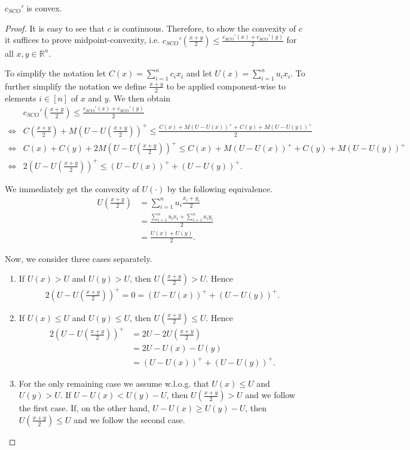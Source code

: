 \begin{lemma}
\label{lemma:integer_minimization_convexity}
$c_{SCO}'$ is convex.
\end{lemma}
\begin{proof}
It is easy to see that $c$ is continuous. Therefore, to show the convexity of $c$ it suffices to prove midpoint-convexity, i.e. $c_{SCO}'(\frac{x+y}{2}) \leq \frac{c_{SCO}'(x)+c_{SCO}'(y)}{2}$ for all $x, y \in \mathbb{R}^n$.

To simplify the notation let $C(x) = \sum_{i=1}^n c_i x_i$ and let $U(x) = \sum_{i=1}^n u_i x_i$. To further simplify the notation we define $\frac{x+y}{2}$ to be applied component-wise to elements $i \in [n]$ of $x$ and $y$. We then obtain \small{
\begin{align*}
         &c_{SCO}'(\frac{x+y}{2}) \leq \frac{c_{SCO}'(x)+c_{SCO}'(y)}{2} \\
    \iff &C(\frac{x+y}{2}) + M(U - U(\frac{x+y}{2}))^+ \leq \frac{C(x) + M(U - U(x))^+ + C(y) + M(U - U(y))^+}{2} \\
    \iff &C(x) + C(y) + 2M(U - U(\frac{x+y}{2}))^+ \leq C(x) + M(U - U(x))^+ + C(y) + M(U - U(y))^+ \\
    \iff &2(U - U(\frac{x+y}{2}))^+ \leq (U - U(x))^+ + (U - U(y))^+.
\end{align*}
}\normalsize

We immediately get the convexity of $U(\cdot)$ by the following equivalence. \begin{align*}
    U(\frac{x+y}{2}) &= \sum_{i=1}^n u_i \frac{x_i + y_i}{2} \\
                     &= \frac{\sum_{i=1}^n u_i x_i + \sum_{i=1}^n u_i y_i}{2} \\
                     &= \frac{U(x) + U(y)}{2}.
\end{align*}

Now, we consider three cases separately.

\begin{enumerate}
    \item If $U(x) > U$ and $U(y) > U$, then $U(\frac{x+y}{2}) > U$. Hence \begin{align*}
        2(U - U(\frac{x+y}{2}))^+ = 0 = (U - U(x))^+ + (U - U(y))^+.
    \end{align*}
    \item If $U(x) \leq U$ and $U(y) \leq U$, then $U(\frac{x+y}{2}) \leq U$. Hence \begin{align*}
        2(U - U(\frac{x+y}{2}))^+ &= 2U - 2U(\frac{x+y}{2}) \\
                                  &= 2U - U(x) - U(y) \\
                                  &= (U - U(x))^+ + (U - U(y))^+.
    \end{align*}
    \item For the only remaining case we assume w.l.o.g. that $U(x) \leq U$ and $U(y) > U$. If $U - U(x) < U(y) - U$, then $U(\frac{x+y}{2}) > U$ and we follow the first case. If, on the other hand, $U - U(x) \geq U(y) - U$, then $U(\frac{x+y}{2}) \leq U$ and we follow the second case.\qedhere
\end{enumerate}
\end{proof}

